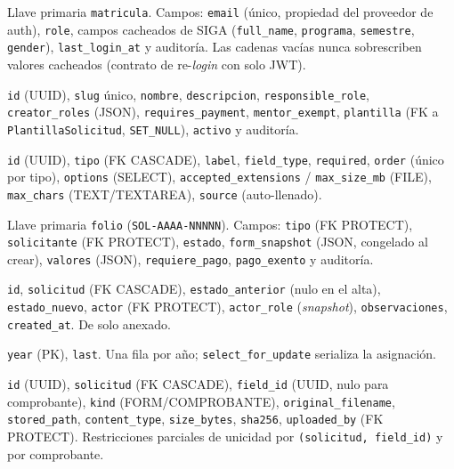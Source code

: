 \documentclass[12pt,letterpaper]{report}
\begin{document}
\begin{description}[leftmargin=0em, style=nextline]
  \item[\texttt{User} (usuarios)] Llave primaria \texttt{matricula}. Campos:
  \texttt{email} (único, propiedad del proveedor de auth), \texttt{role},
  campos cacheados de SIGA (\texttt{full\_name}, \texttt{programa},
  \texttt{semestre}, \texttt{gender}), \texttt{last\_login\_at} y auditoría. Las
  cadenas vacías nunca sobrescriben valores cacheados (contrato de re-\textit{login}
  con solo JWT).

  \item[\texttt{TipoSolicitud} (solicitudes)] \texttt{id} (UUID), \texttt{slug}
  único, \texttt{nombre}, \texttt{descripcion}, \texttt{responsible\_role},
  \texttt{creator\_roles} (JSON), \texttt{requires\_payment},
  \texttt{mentor\_exempt}, \texttt{plantilla} (FK a \texttt{PlantillaSolicitud},
  \texttt{SET\_NULL}), \texttt{activo} y auditoría.

  \item[\texttt{FieldDefinition} (solicitudes)] \texttt{id} (UUID), \texttt{tipo}
  (FK CASCADE), \texttt{label}, \texttt{field\_type}, \texttt{required},
  \texttt{order} (único por tipo), \texttt{options} (SELECT),
  \texttt{accepted\_extensions} / \texttt{max\_size\_mb} (FILE),
  \texttt{max\_chars} (TEXT/TEXTAREA), \texttt{source} (auto-llenado).

  \item[\texttt{Solicitud} (solicitudes)] Llave primaria \texttt{folio}
  (\texttt{SOL-AAAA-NNNNN}). Campos: \texttt{tipo} (FK PROTECT),
  \texttt{solicitante} (FK PROTECT), \texttt{estado},
  \texttt{form\_snapshot} (JSON, congelado al crear), \texttt{valores} (JSON),
  \texttt{requiere\_pago}, \texttt{pago\_exento} y auditoría.

  \item[\texttt{HistorialEstado} (solicitudes)] \texttt{id}, \texttt{solicitud}
  (FK CASCADE), \texttt{estado\_anterior} (nulo en el alta), \texttt{estado\_nuevo},
  \texttt{actor} (FK PROTECT), \texttt{actor\_role} (\textit{snapshot}),
  \texttt{observaciones}, \texttt{created\_at}. De solo anexado.

  \item[\texttt{FolioCounter} (solicitudes)] \texttt{year} (PK), \texttt{last}.
  Una fila por año; \texttt{select\_for\_update} serializa la asignación.

  \item[\texttt{ArchivoSolicitud} (solicitudes)] \texttt{id} (UUID),
  \texttt{solicitud} (FK CASCADE), \texttt{field\_id} (UUID, nulo para
  comprobante), \texttt{kind} (FORM/COMPROBANTE), \texttt{original\_filename},
  \texttt{stored\_path}, \texttt{content\_type}, \texttt{size\_bytes},
  \texttt{sha256}, \texttt{uploaded\_by} (FK PROTECT). Restricciones parciales de
  unicidad por \texttt{(solicitud, field\_id)} y por comprobante.


\end{description}
\end{document}
